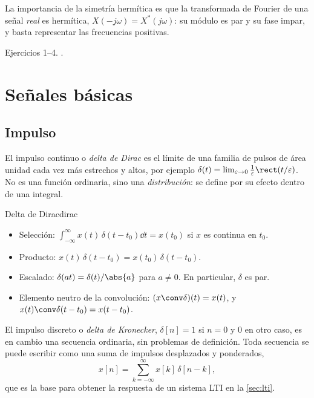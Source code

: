 \documentclass[11pt,a4paper]{scrartcl}
\begin{document}
La importancia de la simetría hermítica es que la transformada de Fourier de una señal \emph{real} es hermítica, $X(-j\omega)=X^*(j\omega)$: su módulo es par y su fase impar, y basta representar las frecuencias positivas.

\begin{flushright}\small\color{pdsgris}Ejercicios 1–4. .\end{flushright}

\section{Señales básicas}\label{sec:basicas}

\subsection{Impulso}

El impulso continuo o \emph{delta de Dirac} es el límite de una familia de pulsos de área unidad cada vez más estrechos y altos, por ejemplo $\delta(t)=\lim_{\varepsilon\to0}\frac1\varepsilon\rect(t/\varepsilon)$. No es una función ordinaria, sino una \emph{distribución}: se define por su efecto dentro de una integral.

\begin{propiedad}{Delta de Dirac}{dirac}
  \begin{itemize}
    \item Selección: $\int_{-\infty}^{\infty}x(t)\,\delta(t-t_0)\dd t=x(t_0)$ si $x$ es continua en $t_0$.
    \item Producto: $x(t)\,\delta(t-t_0)=x(t_0)\,\delta(t-t_0)$.
    \item Escalado: $\delta(at)=\delta(t)/\abs{a}$ para $a\ne0$. En particular, $\delta$ es par.
    \item Elemento neutro de la convolución: $(x\conv\delta)(t)=x(t)$, y $x(t)\conv\delta(t-t_0)=x(t-t_0)$.
  \end{itemize}
\end{propiedad}

El impulso discreto o \emph{delta de Kronecker}, $\delta[n]=1$ si $n=0$ y $0$ en otro caso, es en cambio una secuencia ordinaria, sin problemas de definición. Toda secuencia se puede escribir como una suma de impulsos desplazados y ponderados,
\begin{equation}\label{eq:descomp-impulsos}
  x[n]=\sum_{k=-\infty}^{\infty}x[k]\,\delta[n-k],
\end{equation}
que es la base para obtener la respuesta de un sistema LTI en la \cref{sec:lti}.
\end{document}

